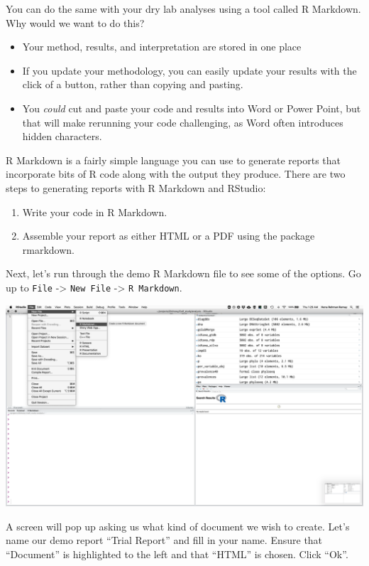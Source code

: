 \documentclass[
]{book}
\providecommand{\tightlist}{%
  \setlength{\itemsep}{0pt}\setlength{\parskip}{0pt}}
\begin{document}
You can do the same with your dry lab analyses using a tool called R Markdown. Why would we want to do this?

\begin{itemize}
\item
  Your method, results, and interpretation are stored in one place
\item
  If you update your methodology, you can easily update your results with the click of a button, rather than copying and pasting.
\item
  You \emph{could} cut and paste your code and results into Word or Power Point, but that will make rerunning your code challenging, as Word often introduces hidden characters.
\end{itemize}

R Markdown is a fairly simple language you can use to generate reports that incorporate bits of R code along with the output they produce. There are two steps to generating reports with R Markdown and RStudio:

\begin{enumerate}
\def\labelenumi{\arabic{enumi}.}
\tightlist
\item
  Write your code in R Markdown.
\item
  Assemble your report as either HTML or a PDF using the package rmarkdown.
\end{enumerate}

Next, let's run through the demo R Markdown file to see some of the options. Go up to \texttt{File} -\textgreater{} \texttt{New\ File} -\textgreater{} \texttt{R\ Markdown}.

\includegraphics{img/markdown.png}

A screen will pop up asking us what kind of document we wish to create. Let's name our demo report ``Trial Report'' and fill in your name. Ensure that ``Document'' is highlighted to the left and that ``HTML'' is chosen. Click ``Ok''.
\end{document}
